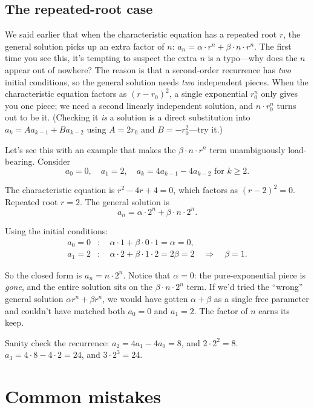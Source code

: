 \documentclass[11pt]{article}
\begin{document}
\subsection*{The repeated-root case}

We said earlier that when the characteristic equation has a repeated root $r$, the general solution picks up an extra factor of $n$: $a_n = \alpha \cdot r^n + \beta \cdot n \cdot r^n$. The first time you see this, it's tempting to suspect the extra $n$ is a typo---why does the $n$ appear out of nowhere? The reason is that a second-order recurrence has \emph{two} initial conditions, so the general solution needs \emph{two} independent pieces. When the characteristic equation factors as $(r - r_0)^2$, a single exponential $r_0^n$ only gives you one piece; we need a second linearly independent solution, and $n \cdot r_0^n$ turns out to be it. (Checking it \emph{is} a solution is a direct substitution into $a_k = A a_{k-1} + B a_{k-2}$ using $A = 2 r_0$ and $B = -r_0^2$---try it.)

Let's see this with an example that makes the $\beta \cdot n \cdot r^n$ term unambiguously load-bearing. Consider
\[
a_0 = 0, \quad a_1 = 2, \quad a_k = 4 a_{k-1} - 4 a_{k-2} \text{ for } k \geq 2.
\]

The characteristic equation is $r^2 - 4r + 4 = 0$, which factors as $(r - 2)^2 = 0$. Repeated root $r = 2$. The general solution is
\[
a_n = \alpha \cdot 2^n + \beta \cdot n \cdot 2^n.
\]

Using the initial conditions:
\begin{align*}
a_0 = 0 &: \quad \alpha \cdot 1 + \beta \cdot 0 \cdot 1 = \alpha = 0, \\
a_1 = 2 &: \quad \alpha \cdot 2 + \beta \cdot 1 \cdot 2 = 2 \beta = 2 \quad \Longrightarrow \quad \beta = 1.
\end{align*}

So the closed form is $a_n = n \cdot 2^n$. Notice that $\alpha = 0$: the pure-exponential piece is \emph{gone}, and the entire solution sits on the $\beta \cdot n \cdot 2^n$ term. If we'd tried the ``wrong'' general solution $\alpha r^n + \beta r^n$, we would have gotten $\alpha + \beta$ as a single free parameter and couldn't have matched both $a_0 = 0$ and $a_1 = 2$. The factor of $n$ earns its keep.

Sanity check the recurrence: $a_2 = 4 a_1 - 4 a_0 = 8$, and $2 \cdot 2^2 = 8$. \checkmark \; $a_3 = 4 \cdot 8 - 4 \cdot 2 = 24$, and $3 \cdot 2^3 = 24$. \checkmark

\section{Common mistakes}
\end{document}
